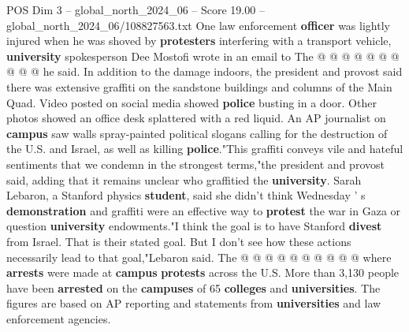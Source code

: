 \begin{textsample}{POS Dim 3 – global\_north\_2024\_06 – Score 19.00 – global\_north\_2024\_06/108827563.txt}
One law enforcement \textbf{officer} was lightly injured when he was shoved by \textbf{protesters} interfering with a transport vehicle, \textbf{university} spokesperson Dee Mostofi wrote in an email to The @ @ @ @ @ @ @ @ @ @ he said.
In addition to the damage indoors, the president and provost said there was extensive graffiti on the sandstone buildings and columns of the Main Quad.
Video posted on social media showed \textbf{police} busting in a door.
Other photos showed an office desk splattered with a red liquid.
An AP journalist on \textbf{campus} saw walls spray-painted political slogans calling for the destruction of the U.S. and Israel, as well as killing \textbf{police}."This graffiti conveys vile and hateful sentiments that we condemn in the strongest terms,"the president and provost said, adding that it remains unclear who graffitied the \textbf{university}.
Sarah Lebaron, a Stanford physics \textbf{student}, said she didn't think Wednesday ' s \textbf{demonstration} and graffiti were an effective way to \textbf{protest} the war in Gaza or question \textbf{university} endowments."I think the goal is to have Stanford \textbf{divest} from Israel.
That is their stated goal.
But I don't see how these actions necessarily lead to that goal,"Lebaron said.
The @ @ @ @ @ @ @ @ @ @ where \textbf{arrests} were made at \textbf{campus} \textbf{protests} across the U.S.
More than 3,130 people have been \textbf{arrested} on the \textbf{campuses} of 65 \textbf{colleges} and \textbf{universities}.
The figures are based on AP reporting and statements from \textbf{universities} and law enforcement agencies.

\end{textsample}
